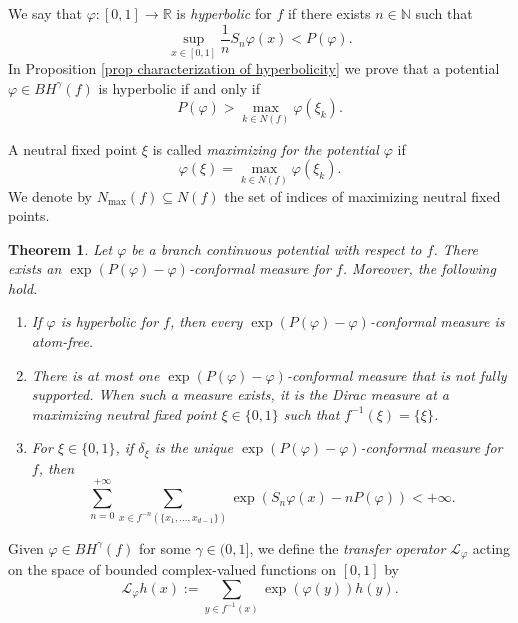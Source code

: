 \documentclass[10pt,a4paper]{amsart}
\numberwithin{equation}{section} %
\numberwithin{figure}{section} %
\newtheorem{theoalph}{Theorem}
\newcommand{\N}{\mathbb{N}}
\newcommand{\R}{\mathbb{R}}
\renewcommand{\=}{\coloneqq}
\newcommand{\Nmax}{N_\text{max}(f)}
\begin{document}
We say that $\varphi\colon[0,1]\to\R$ is \emph{hyperbolic} for $f$ if there exists $n\in \N$ such that
\begin{equation}\label{equation hyperbolicity introduction}
    \sup_{x\in[0,1]}\frac{1}{n}S_n\varphi(x) < P(\varphi).
\end{equation}
In Proposition \ref{prop characterization of hyperbolicity} we prove that a potential $\varphi\in BH^{\gamma}(f)$ is hyperbolic if and only if
\begin{equation}\label{eq equivalence of hyperbolicity}
    P(\varphi)> \max_{k\in N(f)}\varphi(\xi_k).
\end{equation}

A neutral fixed point $\xi$ is called \emph{maximizing for the potential $\varphi$} if
\begin{equation}
    \varphi(\xi) = \max_{k\in N(f)}\varphi(\xi_k).
\end{equation}
We denote by $\Nmax\subseteq N(f)$ the set of indices of maximizing neutral fixed points.

\begin{theoalph}\label{t: conformal measure}
Let $\varphi$ be a branch continuous potential with respect to $f$. There exists an $\exp(P(\varphi)-\varphi)$-conformal measure for $f$. Moreover, the following hold.
\begin{enumerate}
    \item[1.] If $\varphi$ is hyperbolic for $f$, then every  $\exp(P(\varphi)-\varphi)$-conformal measure is atom-free.
    \item[2.] There is at most one $\exp(P(\varphi)-\varphi)$-conformal measure that is not fully supported. When such a measure exists, it is the Dirac measure at a maximizing neutral fixed point $\xi\in\{0,1\}$ such that $f^{-1}(\xi)=\{\xi\}$.
    \item[3.] For $\xi\in\{0,1\}$, if $\delta_\xi$ is the unique  $\exp(P(\varphi)- \varphi)$-conformal measure for $f$, then
    \begin{equation}\label{e: eq 1 thm A}
        \sum_{n=0}^{+\infty}\sum_{x\in f^{-n}(\{x_1,\dots,x_{d-1}\})}\exp(S_n\varphi(x)- nP(\varphi))<+\infty.
    \end{equation}
\end{enumerate}
\end{theoalph}

Given $\varphi\in BH^{\gamma}(f)$ for some $\gamma\in(0,1]$, we define the \emph{transfer operator} $\mathcal{L}_{\varphi}$ acting on the space of bounded complex-valued functions on $[0,1]$ by
\begin{equation}\label{eq transfer operator 3}
    \mathcal{L}_{\varphi}h (x) := \sum_{y\in f^{-1}(x)}\exp(\varphi(y))h(y).
\end{equation}
\end{document}
